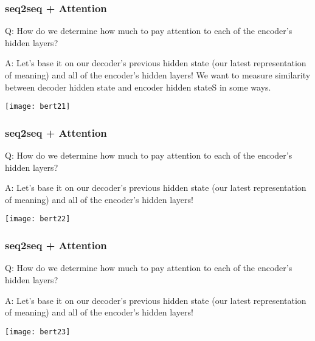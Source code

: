\begin{frame}[fragile]\frametitle{seq2seq + Attention}

Q: How do we determine how much to pay attention to each of the encoder’s hidden layers? 

A: Let’s base it on our decoder’s previous hidden state (our latest representation of meaning) and all of the encoder’s hidden layers! We want to measure similarity between decoder hidden state and encoder hidden stateS in some ways. 



\begin{center}
\texttt{[image: bert21]}
\end{center}	

\end{frame}

\begin{frame}[fragile]\frametitle{seq2seq + Attention}

Q: How do we determine how much to pay attention to each of the encoder’s hidden layers? 

A: Let’s base it on our decoder’s previous hidden state (our latest representation of meaning) and all of the encoder’s hidden layers!



\begin{center}
\texttt{[image: bert22]}
\end{center}	

\end{frame}

\begin{frame}[fragile]\frametitle{seq2seq + Attention}

Q: How do we determine how much to pay attention to each of the encoder’s hidden layers? 

A: Let’s base it on our decoder’s previous hidden state (our latest representation of meaning) and all of the encoder’s hidden layers!



\begin{center}
\texttt{[image: bert23]}
\end{center}	

\end{frame}

